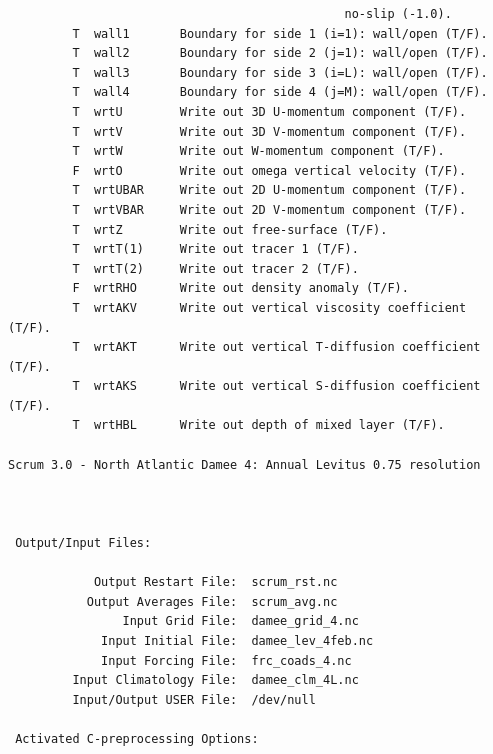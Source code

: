 \begin{verbatim}
                                               no-slip (-1.0).
         T  wall1       Boundary for side 1 (i=1): wall/open (T/F).
         T  wall2       Boundary for side 2 (j=1): wall/open (T/F).
         T  wall3       Boundary for side 3 (i=L): wall/open (T/F).
         T  wall4       Boundary for side 4 (j=M): wall/open (T/F).
         T  wrtU        Write out 3D U-momentum component (T/F).
         T  wrtV        Write out 3D V-momentum component (T/F).
         T  wrtW        Write out W-momentum component (T/F).
         F  wrtO        Write out omega vertical velocity (T/F).
         T  wrtUBAR     Write out 2D U-momentum component (T/F).
         T  wrtVBAR     Write out 2D V-momentum component (T/F).
         T  wrtZ        Write out free-surface (T/F).
         T  wrtT(1)     Write out tracer 1 (T/F).
         T  wrtT(2)     Write out tracer 2 (T/F).
         F  wrtRHO      Write out density anomaly (T/F).
         T  wrtAKV      Write out vertical viscosity coefficient (T/F).
         T  wrtAKT      Write out vertical T-diffusion coefficient (T/F).
         T  wrtAKS      Write out vertical S-diffusion coefficient (T/F).
         T  wrtHBL      Write out depth of mixed layer (T/F).

Scrum 3.0 - North Atlantic Damee 4: Annual Levitus 0.75 resolution
       


 Output/Input Files:

            Output Restart File:  scrum_rst.nc
           Output Averages File:  scrum_avg.nc
                Input Grid File:  damee_grid_4.nc
             Input Initial File:  damee_lev_4feb.nc
             Input Forcing File:  frc_coads_4.nc
         Input Climatology File:  damee_clm_4L.nc
         Input/Output USER File:  /dev/null

 Activated C-preprocessing Options:


\end{verbatim}
